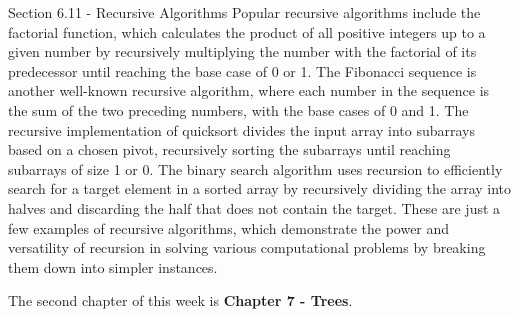 \begin{notes}{Section 6.11 - Recursive Algorithms}
    Popular recursive algorithms include the factorial function, which calculates the product of all positive integers up to a given number by recursively multiplying the number with the factorial of its predecessor until reaching the base case of 0 or 1. The Fibonacci sequence is another well-known recursive algorithm, where each number in the sequence is the sum of 
    the two preceding numbers, with the base cases of 0 and 1. The recursive implementation of quicksort divides the input array into subarrays based on a chosen pivot, recursively sorting the subarrays until reaching subarrays of size 1 or 0. The binary search algorithm uses recursion to efficiently search for a target element in a sorted array by recursively dividing 
    the array into halves and discarding the half that does not contain the target. These are just a few examples of recursive algorithms, which demonstrate the power and versatility of recursion in solving various computational problems by breaking them down into simpler instances.
\end{notes}

The second chapter of this week is \textbf{Chapter 7 - Trees}.

